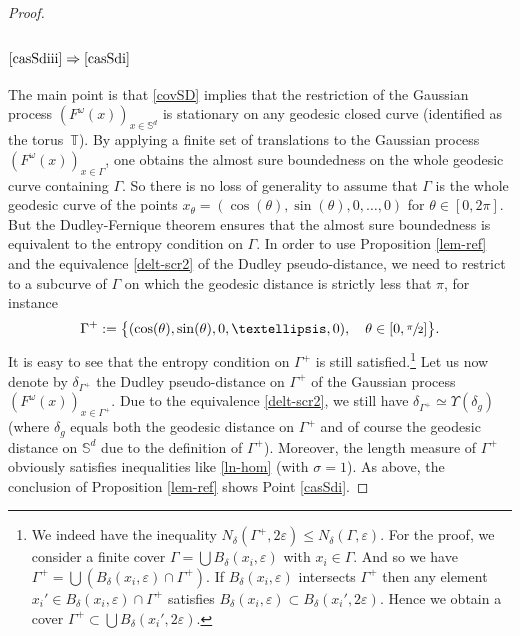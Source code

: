 \documentclass[11pt]{article}
\theoremstyle{theorem}
\theoremstyle{definition}
\newcommand\bbS{\mathbb{S}}
\newcommand\ep{\varepsilon}
\begin{document}
\begin{proof}
\subsubsection*{$\eqref{casSdiii}\Rightarrow\eqref{casSdi}$}
The main point is that \eqref{covSD} implies that the restriction of the Gaussian process $(F^\omega(x))_{x\in\bbS^d}$ is stationary on any geodesic closed curve (identified as the torus~$\mathbb{T}$).
By applying a finite set of translations to the Gaussian process $(F^\omega(x))_{x\in \Gamma}$, one obtains the almost sure boundedness on the whole geodesic curve containing $\Gamma$.
So there is no loss of generality to assume that $\Gamma$ is the whole geodesic curve of the points $x_\theta=(\cos(\theta),\sin(\theta),0,\dots,0)$ for $\theta \in [0,2\pi]$.
But the Dudley-Fernique theorem ensures that the almost sure boundedness is equivalent to the entropy condition on $\Gamma$.
In order to use Proposition \ref{lem-ref} and the equivalence \eqref{delt-scr2} of the Dudley pseudo-distance, we need to restrict to a subcurve of $\Gamma$ on which the geodesic distance is strictly less that $\pi$, for instance
\begin{equation}\label{gammapl}
\Gamma^{+}:=\bigl\{(\cos(\theta),\sin(\theta),0,\dots,0),\quad \theta \in[0,\sfrac{\pi}{2}] \bigr\}.
\end{equation}
It is easy to see that the entropy condition on $\Gamma^{+}$ is still satisfied.\footnote{We indeed have the inequality $N_{\delta}(\Gamma^+,2\ep)\leq N_{\delta}(\Gamma,\ep)$. For the proof, we consider a finite cover $\Gamma=\bigcup B_{\delta}(x_i,\ep)$ with $x_i\in \Gamma$.
And so we have $\Gamma^+=\bigcup (B_{\delta}(x_i,\ep)\cap \Gamma^+)$.
If $B_{\delta}(x_i,\ep)$ intersects $\Gamma^+$ then any element $x_i'\in B_{\delta}(x_i,\ep)\cap \Gamma^{+}$ satisfies $B_{\delta}(x_i,\ep)\subset B_{\delta}(x_i',2\ep)$. Hence we obtain a cover $\Gamma^+\subset \bigcup B_{\delta}(x_i',2\ep)$.}
Let us now denote by $\delta_{\Gamma^+}$ the Dudley pseudo-distance on $\Gamma^+$ of the Gaussian process $(F^\omega(x))_{x\in \Gamma^+}$. Due to the equivalence \eqref{delt-scr2}, we still have $\delta_{\Gamma^+}\simeq \Upsilon(\delta_g)$ (where $\delta_g$ equals both the geodesic distance on $\Gamma^{+}$ and of course the geodesic distance on $\bbS^d$ due to the definition of $\Gamma^{+}$). Moreover, the length measure of $\Gamma^+$ obviously satisfies inequalities like \eqref{ln-hom} (with $\sigma=1$). As above, the conclusion of Proposition \ref{lem-ref} shows Point \eqref{casSdi}.
\end{proof}
\end{document}
